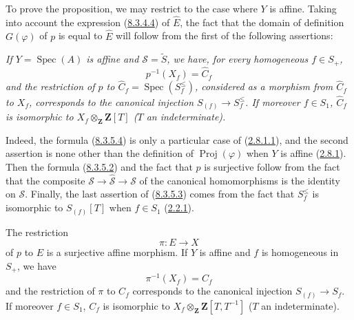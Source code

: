 To prove the proposition, we may restrict to the case where $Y$ is affine.
Taking into account the expression (\hyperref[II.8.3.4.4]{8.3.4.4}) of
$\widehat{E}$, the fact that the domain of definition $G(\varphi)$ of $p$ is
equal to $\widehat{E}$ will follow from the first of the following assertions:

\begin{env}[8.3.5.3]
\label{II.8.3.5.3}
\itshape If $Y=\operatorname{Spec}(A)$ is affine and $\mathcal{S}=\widetilde{S}$, we
have, for every homogeneous $f\in S_+$,
\begin{equation}
\label{II.8.3.5.4}
  p^{-1}(X_f)=\widehat{C}_f
\tag{8.3.5.4}
\end{equation}
and the restriction of $p$ to
$\widehat{C}_f=\operatorname{Spec}(S_f^{\leq})$, considered as a morphism from
$\widehat{C}_f$ to $X_f$, corresponds to the canonical injection
$S_{(f)}\to S_f^{\leq}$. If moreover $f\in S_1$, $\widehat{C}_f$ is isomorphic
to $X_f\otimes_{\mathbf{Z}}\mathbf{Z}[T]$ ($T$ an indeterminate).
\end{env}

Indeed, the formula (\hyperref[II.8.3.5.4]{8.3.5.4}) is only a
particular case of (\hyperref[II.2.8.1.1]{2.8.1.1}), and the second assertion
is none other than the definition of $\operatorname{Proj}(\varphi)$ when $Y$
is affine (\hyperref[II.2.8.1]{2.8.1}). Then the formula
(\hyperref[II.8.3.5.2]{8.3.5.2}) and the fact that $p$ is surjective follow
from the fact that the composite $\mathcal{S}\to\widehat{\mathcal{S}}\to\mathcal{S}$ of the
canonical homomorphisms is the identity on $\mathcal{S}$. Finally, the
last assertion of (\hyperref[II.8.3.5.3]{8.3.5.3}) comes from the fact that
$S_f^{\leq}$ is isomorphic to $S_{(f)}[T]$ when $f\in S_1$
(\hyperref[II.2.2.1]{2.2.1}).

\begin{corollary}[8.3.6]
\label{II.8.3.6}
The restriction
\begin{equation}
\label{II.8.3.6.1}
  \pi:E\to X
\tag{8.3.6.1}
\end{equation}
of $p$ to $E$ is a surjective affine morphism. If $Y$ is affine and $f$ is
homogeneous in $S_+$, we have
\begin{equation}
\label{II.8.3.6.2}
  \pi^{-1}(X_f)=C_f
\tag{8.3.6.2}
\end{equation}
and the restriction of $\pi$ to $C_f$ corresponds to the canonical injection
$S_{(f)}\to S_f$. If moreover $f\in S_1$, $C_f$ is isomorphic to
$X_f\otimes_{\mathbf{Z}}\mathbf{Z}[T,T^{-1}]$ ($T$ an indeterminate).
\end{corollary}


